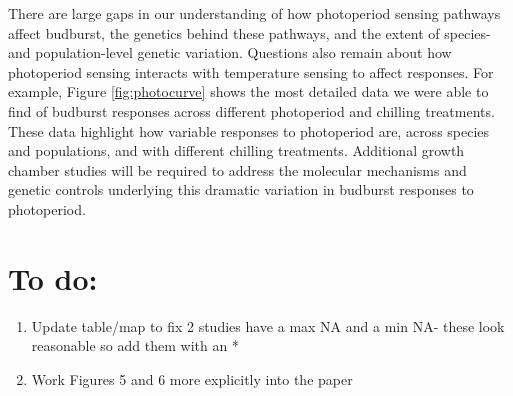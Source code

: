 \documentclass{article}
\begin{document}
\par There are large gaps in our understanding of how photoperiod sensing pathways affect budburst, the genetics behind these pathways, and the extent of species- and population-level genetic variation. Questions also remain about how photoperiod sensing interacts with temperature sensing to affect responses. For example, Figure \ref{fig:photocurve} shows the most detailed data we were able to find of budburst responses across different photoperiod and chilling treatments. These data highlight how variable responses to photoperiod are, across species and populations, and with different chilling treatments. Additional growth chamber studies will be required to address the molecular mechanisms and genetic controls underlying this dramatic variation in  budburst responses to photoperiod. 

\section* {To do:}
\begin{enumerate}
\item Update table/map to fix 2 studies have a max NA and a min NA- these look reasonable so add them with an *
\item Work Figures 5 and 6 more explicitly into the paper

\end{enumerate}


\clearpage
\end{document}
